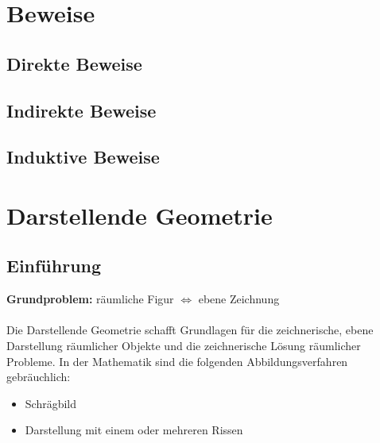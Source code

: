 \documentclass[12pt,a4paper]{scrbook}
\begin{document}
\chapter{Beweise}
\section{Direkte Beweise}

\section{Indirekte Beweise}

\section{Induktive Beweise}

\chapter{Darstellende Geometrie}
\section{Einführung}
\textbf{Grundproblem:} räumliche Figur $\Leftrightarrow$ ebene Zeichnung \\\\
Die Darstellende Geometrie schafft Grundlagen für die zeichnerische, ebene Darstellung räumlicher Objekte
und die zeichnerische Lösung räumlicher Probleme. In der Mathematik sind die
folgenden Abbildungsverfahren gebräuchlich:

\begin{itemize}
  \item Schrägbild
  \item Darstellung mit einem oder mehreren Rissen
\end{itemize}
\end{document}
